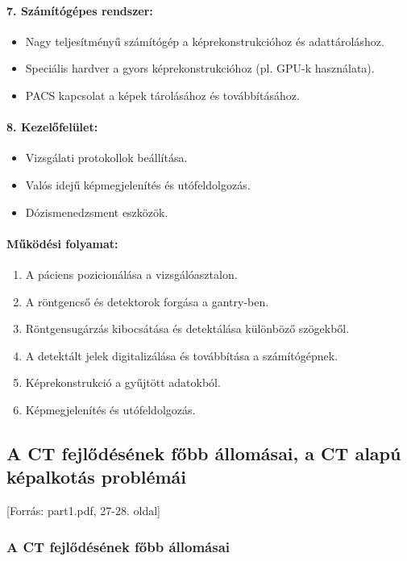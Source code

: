 \documentclass[a4paper,12pt]{article}
\begin{document}
\paragraph{7. Számítógépes rendszer:} \begin{itemize} \item Nagy teljesítményű számítógép a képrekonstrukcióhoz és adattároláshoz. \item Speciális hardver a gyors képrekonstrukcióhoz (pl. GPU-k használata). \item PACS kapcsolat a képek tárolásához és továbbításához. \end{itemize}

\paragraph{8. Kezelőfelület:} \begin{itemize} \item Vizsgálati protokollok beállítása. \item Valós idejű képmegjelenítés és utófeldolgozás. \item Dózismenedzsment eszközök. \end{itemize}

\paragraph{Működési folyamat:} \begin{enumerate} \item A páciens pozicionálása a vizsgálóasztalon. \item A röntgencső és detektorok forgása a gantry-ben. \item Röntgensugárzás kibocsátása és detektálása különböző szögekből. \item A detektált jelek digitalizálása és továbbítása a számítógépnek. \item Képrekonstrukció a gyűjtött adatokból. \item Képmegjelenítés és utófeldolgozás. \end{enumerate}

\subsection{A CT fejlődésének főbb állomásai, a CT alapú képalkotás problémái} [Forrás: part1.pdf, 27-28. oldal]

\subsubsection{A CT fejlődésének főbb állomásai}
\end{document}
